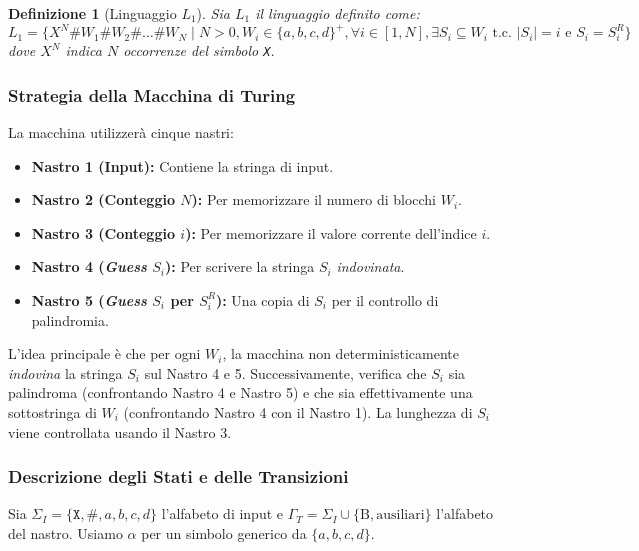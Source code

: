 \documentclass[a4paper, 11pt]{book} %
\newtheorem{definition}[theorem]{Definizione}
\theoremstyle{definition}
\newcommand{\B}{\text{B}} %
\begin{document}
\begin{definition}[Linguaggio $L_1$]
Sia $L_1$ il linguaggio definito come:
$L_1 = \{ X^N \texttt{\#} W_1 \texttt{\#} W_2 \texttt{\#} \dots \texttt{\#} W_N \mid N > 0, W_i \in \{a,b,c,d\}^+, \forall i \in [1, N], \exists S_i \subseteq W_i \text{ t.c. } |S_i| = i \text{ e } S_i = S_i^R \}$
dove $X^N$ indica $N$ occorrenze del simbolo \texttt{X}.
\end{definition}

\subsubsection{Strategia della Macchina di Turing}
La macchina utilizzerà cinque nastri:
\begin{itemize}
    \item \textbf{Nastro 1 (Input):} Contiene la stringa di input.
    \item \textbf{Nastro 2 (Conteggio $N$):} Per memorizzare il numero di blocchi $W_i$.
    \item \textbf{Nastro 3 (Conteggio $i$):} Per memorizzare il valore corrente dell'indice $i$.
    \item \textbf{Nastro 4 (\textit{Guess} $S_i$):} Per scrivere la stringa $S_i$ \textit{indovinata}.
    \item \textbf{Nastro 5 (\textit{Guess} $S_i$ per $S_i^R$):} Una copia di $S_i$ per il controllo di palindromia.
\end{itemize}

L'idea principale è che per ogni $W_i$, la macchina non deterministicamente \textit{indovina} la stringa $S_i$ sul Nastro 4 e 5. Successivamente, verifica che $S_i$ sia palindroma (confrontando Nastro 4 e Nastro 5) e che sia effettivamente una sottostringa di $W_i$ (confrontando Nastro 4 con il Nastro 1). La lunghezza di $S_i$ viene controllata usando il Nastro 3.

\subsubsection{Descrizione degli Stati e delle Transizioni}
Sia $\Sigma_I = \{\texttt{X}, \texttt{\#}, a,b,c,d\}$ l'alfabeto di input e $\Gamma_T = \Sigma_I \cup \{\B, \text{ausiliari}\}$ l'alfabeto del nastro. Usiamo $\alpha$ per un simbolo generico da $\{a,b,c,d\}$.
\end{document}
